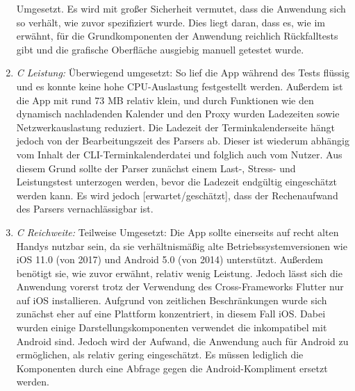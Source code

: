 \begin{enumerate}
		Umgesetzt. Es wird mit großer Sicherheit vermutet, dass die Anwendung sich so verhält, wie zuvor spezifiziert wurde. Dies liegt daran, dass es, wie im  erwähnt, für die Grundkomponenten der Anwendung reichlich Rückfalltests gibt und die grafische Oberfläche ausgiebig manuell getestet wurde.%
	\item \textit{C Leistung:}\newline%
		Überwiegend umgesetzt: %
		So lief die App während des Tests flüssig und es konnte keine hohe CPU-Auslastung festgestellt werden. %
		Außerdem ist die App mit rund 73 MB relativ klein, und durch Funktionen wie den dynamisch nachladenden Kalender und den Proxy wurden Ladezeiten sowie Netzwerkauslastung reduziert. %
		Die Ladezeit der Terminkalenderseite hängt jedoch von der Bearbeitungszeit des Parsers ab. Dieser ist wiederum abhängig vom Inhalt der CLI-Terminkalenderdatei und folglich auch vom Nutzer. Aus diesem Grund sollte der Parser zunächst einem Last-, Stress- und Leistungstest unterzogen werden, bevor die Ladezeit endgültig eingeschätzt werden kann. Es wird jedoch [erwartet/geschätzt], dass der Rechenaufwand des Parsers vernachlässigbar ist.%
	\item \textit{C Reichweite:}\newline%
		Teilweise Umgesetzt: %
		Die App sollte einerseits auf recht alten Handys nutzbar sein, da sie verhältnismäßig alte Betriebssystemversionen wie iOS 11.0 (von 2017) und Android 5.0 (von 2014) unterstützt. Außerdem benötigt sie, wie zuvor erwähnt, relativ wenig Leistung. %
		Jedoch lässt sich die Anwendung vorerst trotz der Verwendung des Cross-Frameworks Flutter nur auf iOS installieren. Aufgrund von zeitlichen Beschränkungen wurde sich zunächst eher auf eine Plattform konzentriert, in diesem Fall iOS. Dabei wurden einige Darstellungskomponenten verwendet die inkompatibel mit Android sind. Jedoch wird der Aufwand, die Anwendung auch für Android zu ermöglichen, als relativ gering eingeschätzt. Es müssen lediglich die Komponenten durch eine Abfrage gegen die Android-Kompliment ersetzt werden.%
\end{enumerate}